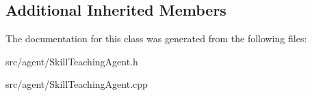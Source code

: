 \subsection*{Additional Inherited Members}


The documentation for this class was generated from the following files\+:\begin{DoxyCompactItemize}
\item 
src/agent/Skill\+Teaching\+Agent.\+h\item 
src/agent/Skill\+Teaching\+Agent.\+cpp\end{DoxyCompactItemize}
